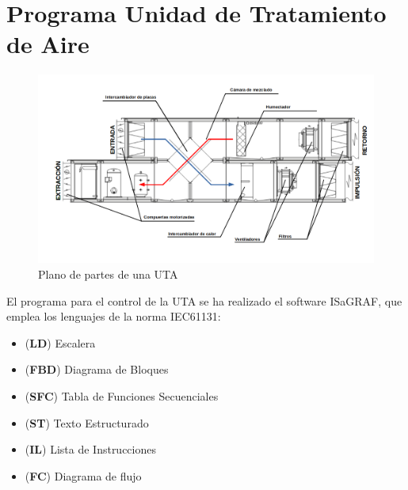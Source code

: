 
\cleardoublepage
\chapter{Programa Unidad de Tratamiento de Aire}

\label{chap:anexoProgramaUTA} %

\begin{figure}[H]
    \centering
    \includegraphics[width=\textwidth, keepaspectratio]{img/esquemaUTA}
    \caption{Plano de partes de una UTA}
    \label{figura:sasssssd}
\end{figure}

El programa para el control de la UTA se ha realizado el software ISaGRAF, que emplea los lenguajes de la norma IEC61131:                   

\begin{itemize}
    \item (\textbf{LD}) Escalera  
    \item (\textbf{FBD}) Diagrama de Bloques 
    \item (\textbf{SFC}) Tabla de Funciones Secuenciales 
    \item (\textbf{ST}) Texto Estructurado 
    \item (\textbf{IL}) Lista de Instrucciones 
    \item (\textbf{FC}) Diagrama de flujo 
  \end{itemize}

